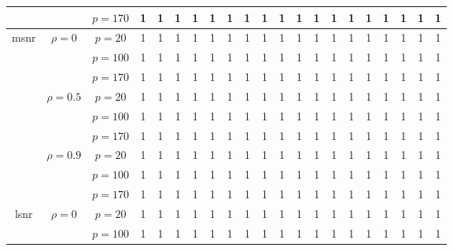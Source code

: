 \documentclass[11pt]{article}
\begin{document}
{\begin{table}[ht!]
{\begin{tabular}{|c|c|c|cc|cc|cc|ccc||cc|cc|cc|ccc|}
      &       & $p=170$ & 1     & 1     & 1     & 1     & 1     & 1     & 1     & 1     & 1     & 1     & 1     & 1     & 1     & 1     & 1     & 1     & 1     & 1 \\
\midrule
\multirow{9}[6]{*}{msnr} & \multirow{3}[2]{*}{$\rho=0$} & $p=20$ & 1     & 1     & 1     & 1     & 1     & 1     & 1     & 1     & 1     & 1     & 1     & 1     & 1     & 1     & 1     & 1     & 1     & 1 \\
      &       & $p=100$ & 1     & 1     & 1     & 1     & 1     & 1     & 1     & 1     & 1     & 1     & 1     & 1     & 1     & 1     & 1     & 1     & 1     & 1 \\
      &       & $p=170$ & 1     & 1     & 1     & 1     & 1     & 1     & 1     & 1     & 1     & 1     & 1     & 1     & 1     & 1     & 1     & 1     & 1     & 1 \\
\cmidrule{2-21}      & \multirow{3}[2]{*}{$\rho=0.5$} & $p=20$ & 1     & 1     & 1     & 1     & 1     & 1     & 1     & 1     & 1     & 1     & 1     & 1     & 1     & 1     & 1     & 1     & 1     & 1 \\
      &       & $p=100$ & 1     & 1     & 1     & 1     & 1     & 1     & 1     & 1     & 1     & 1     & 1     & 1     & 1     & 1     & 1     & 1     & 1     & 1 \\
      &       & $p=170$ & 1     & 1     & 1     & 1     & 1     & 1     & 1     & 1     & 1     & 1     & 1     & 1     & 1     & 1     & 1     & 1     & 1     & 1 \\
\cmidrule{2-21}      & \multirow{3}[2]{*}{$\rho=0.9$} & $p=20$ & 1     & 1     & 1     & 1     & 1     & 1     & 1     & 1     & 1     & 1     & 1     & 1     & 1     & 1     & 1     & 1     & 1     & 1 \\
      &       & $p=100$ & 1     & 1     & 1     & 1     & 1     & 1     & 1     & 1     & 1     & 1     & 1     & 1     & 1     & 1     & 1     & 1     & 1     & 1 \\
      &       & $p=170$ & 1     & 1     & 1     & 1     & 1     & 1     & 1     & 1     & 1     & 1     & 1     & 1     & 1     & 1     & 1     & 1     & 1     & 1 \\
\midrule
\multirow{9}[6]{*}{lsnr} & \multirow{3}[2]{*}{$\rho=0$} & $p=20$ & 1     & 1     & 1     & 1     & 1     & 1     & 1     & 1     & 1     & 1     & 1     & 1     & 1     & 1     & 1     & 1     & 1     & 1 \\
      &       & $p=100$ & 1     & 1     & 1     & 1     & 1     & 1     & 1     & 1     & 1     & 1     & 1     & 1     & 1     & 1     & 1     & 1     & 1     & 1 \\

\end{tabular}}
\end{table}}
\end{document}
